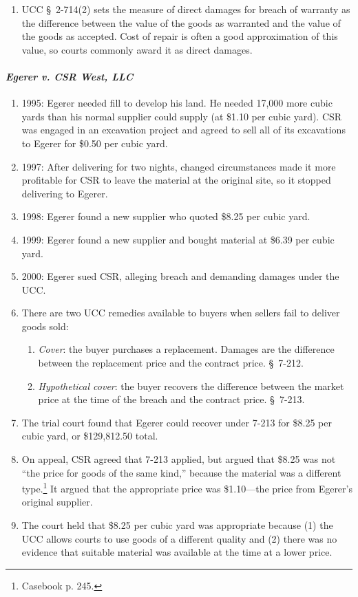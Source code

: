 \begin{enumerate}
    \item UCC \S\ 2-714(2) sets the measure of direct damages for breach of 
    warranty as the difference between the value of the goods as warranted and 
    the value of the goods as accepted. Cost of repair is often a good 
    approximation of this value, so courts commonly award it as direct 
    damages.
\end{enumerate}

\paragraph{\emph{Egerer v. CSR West, LLC}}

\begin{enumerate}
    \item 1995: Egerer needed fill to develop his land. He needed 17,000 more cubic 
    yards than his normal supplier could supply (at \$1.10 per cubic yard). 
    CSR was engaged in an excavation project and agreed to sell all of its 
    excavations to Egerer for \$0.50 per cubic yard.
    \item 1997: After delivering for two nights, changed circumstances made it 
    more 
    profitable for CSR to leave the material at the original site, so it 
    stopped delivering to Egerer.
    \item 1998: Egerer found a new supplier who quoted \$8.25 per cubic yard.
    \item 1999: Egerer found a new supplier and bought material at \$6.39 per 
    cubic yard.
    \item 2000: Egerer sued CSR, alleging breach and demanding damages under 
    the UCC.
    \item There are two UCC remedies available to buyers when sellers fail to 
    deliver goods sold:
    \begin{enumerate}
        \item \emph{Cover}: the buyer purchases a replacement. Damages are the 
        difference between the replacement price and the contract price. \S\ 
        7-212.
        \item \emph{Hypothetical cover}: the buyer recovers the difference 
        between the market price at the time of the breach and the contract 
        price. \S\ 7-213.
    \end{enumerate}
    \item The trial court found that Egerer could recover under 7-213 for 
    \$8.25 per cubic yard, or \$129,812.50 total.
    \item On appeal, CSR agreed that 7-213 applied, but argued that \$8.25 was 
    not ``the price for goods of the same kind,'' because the material was a 
    different type.\footnote{Casebook p. 245.} It argued that the appropriate 
    price was \$1.10---the price from Egerer's original supplier.
    \item The court held that \$8.25 per cubic yard was appropriate because 
    (1) the UCC allows courts to use goods of a different quality and (2) 
    there was no evidence that suitable material was available at the time at 
    a lower price.
\end{enumerate}


